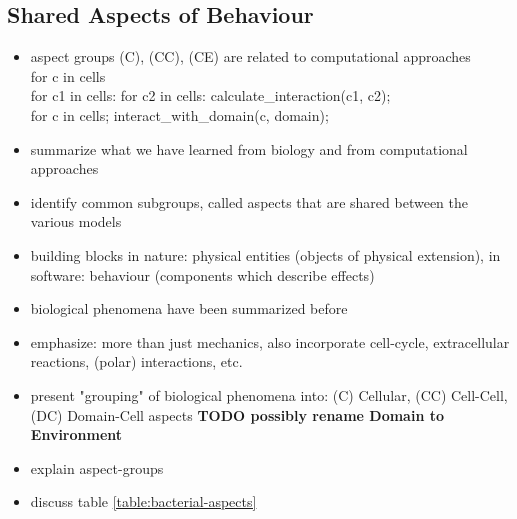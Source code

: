 \subsection{Shared Aspects of Behaviour}
\begin{itemize}
    \item aspect groups (C), (CC), (CE) are related to computational approaches\\
        for c in cells\\
        for c1 in cells: for c2 in cells: calculate\_interaction(c1, c2);\\
        for c in cells; interact\_with\_domain(c, domain);
    \item summarize what we have learned from biology and from computational approaches
    \item identify common subgroups, called aspects that are shared between the various models
    \item building blocks in nature:
        physical entities (objects of physical extension),
        in software: behaviour (components which describe effects)
\end{itemize}

\begin{itemize}
    \item biological phenomena have been summarized before
    \item emphasize: more than just mechanics, also incorporate cell-cycle, extracellular
        reactions, (polar) interactions, etc.
    \item present "grouping" of biological phenomena into: (C) Cellular, (CC) Cell-Cell, (DC)
        Domain-Cell aspects \textbf{TODO possibly rename Domain to Environment}
    \item explain aspect-groups
    \item discuss table \ref{table:bacterial-aspects}
\end{itemize}

